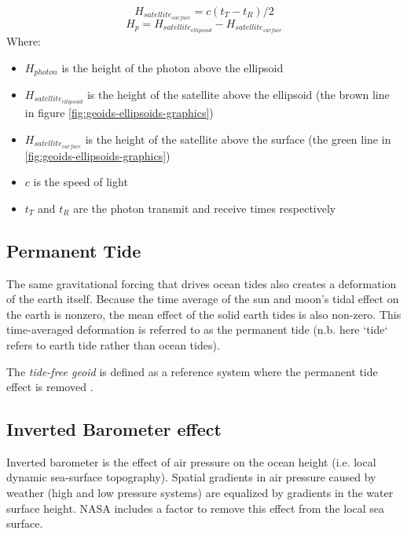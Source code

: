 \begin{equation}\label{eq:raw_photon_calculation}
      H_{satellite_{surface}} = c(t_T-t_R)/2
\end{equation}
\begin{equation}
      H_p = H_{satellite_{ellipsoid}} - H_{satellite_{surface}}
\end{equation}
Where:
\begin{itemize}
      \item $H_{photon}$ is the height of the photon above the ellipsoid
      \item $H_{satellite_{ellipsoid}}$ is the height of the satellite above the ellipsoid (the brown line in figure \ref{fig:geoids-ellipsoids-graphics})
      \item $H_{satellite_{surface}}$ is the height of the satellite above the surface (the green line in \ref{fig:geoids-ellipsoids-graphics})
      \item $c$ is the speed of light
      \item $t_T$ and $t_R$ are the photon transmit and receive times respectively
\end{itemize}

\subsection{Permanent Tide}
The same gravitational forcing that drives ocean tides also creates a deformation of the earth itself. Because the time average of the sun and moon's tidal effect on the earth is nonzero, the mean effect of the solid earth tides is also non-zero. This time-averaged deformation is referred to as the permanent tide (n.b. here `tide` refers to earth tide rather than ocean tides).

The \emph{tide-free geoid} is defined as a reference system where the permanent tide effect is removed \parencite{Makinen2009}.


\subsection{Inverted Barometer effect}
Inverted barometer is the effect of air pressure on the ocean height (i.e. local dynamic sea-surface topography)\parencite{comparison guide}. Spatial gradients in air pressure caused by weather (high and low pressure systems) are equalized by gradients in the water surface height. NASA includes a factor to remove this effect from the local sea surface.

